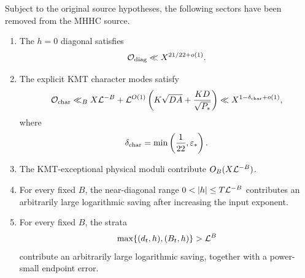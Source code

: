 \begin{proposition}\label{prop:old-closed}
Subject to the original source hypotheses, the following sectors have been
removed from the MHHC source.
\begin{enumerate}[label=\textup{(\roman*)},leftmargin=2.7em]
\item The $h=0$ diagonal satisfies
      \begin{equation}\label{eq:diag-bound}
               \mathcal O_{\mathrm{diag}}\ll X^{21/22+o(1)}.
      \end{equation}
\item The explicit KMT character modes satisfy
      \begin{equation}\label{eq:char-bound}
       \mathcal O_{\mathrm{char}}
       \ll_B X\mathcal L^{-B}+\mathcal L^{O(1)}
          \left(K\sqrt{DA}+\frac{KD}{\sqrt{P_*}}\right)
       \ll X^{1-\delta_{\mathrm{char}}+o(1)},
      \end{equation}
      where
      \[
             \delta_{\mathrm{char}}
              =\min\left(\frac1{22},\varepsilon_*\right).
      \]
\item The KMT-exceptional physical moduli contribute $O_B(X\mathcal L^{-B})$.
\item For every fixed $B$, the near-diagonal range
      $0<|h|\le T\LL^{-B}$ contributes an arbitrarily large logarithmic
      saving after increasing the input exponent.
\item For every fixed $B$, the strata
      \[
       \max\{(d_t,h),(B_t,h)\}>\mathcal L^B
      \]
      contribute an arbitrarily large logarithmic saving, together with a
      power-small endpoint error.
\end{enumerate}
\end{proposition}

